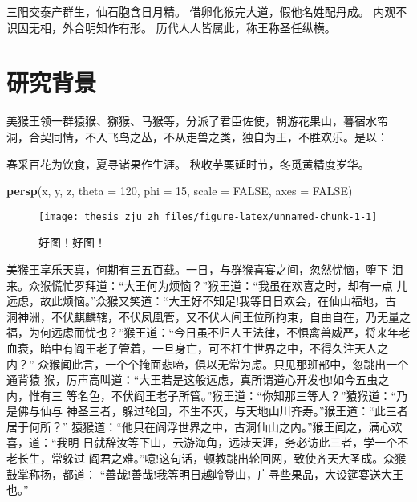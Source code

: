 \documentclass[]{style/zjuthesis}
\newenvironment{Shaded}{\begin{snugshade}}{\end{snugshade}}
\newcommand{\KeywordTok}[1]{\textcolor[rgb]{0.13,0.29,0.53}{\textbf{{#1}}}}
\newcommand{\DataTypeTok}[1]{\textcolor[rgb]{0.13,0.29,0.53}{{#1}}}
\newcommand{\DecValTok}[1]{\textcolor[rgb]{0.00,0.00,0.81}{{#1}}}
\newcommand{\OtherTok}[1]{\textcolor[rgb]{0.56,0.35,0.01}{{#1}}}
\newcommand{\NormalTok}[1]{{#1}}
\begin{document}
三阳交泰产群生，仙石胞含日月精。 借卵化猴完大道，假他名姓配丹成。
内观不识因无相，外合明知作有形。 历代人人皆属此，称王称圣任纵横。

\ZJUcontents

\ZJUmainmatter

\chapter{研究背景}

美猴王领一群猿猴、猕猴、马猴等，分派了君臣佐使，朝游花果山，暮宿水帘
洞，合契同情，不入飞鸟之丛，不从走兽之类，独自为王，不胜欢乐。是以\citep{R-base}：

春采百花为饮食，夏寻诸果作生涯。 秋收芋栗延时节，冬觅黄精度岁华。

\begin{Shaded}
\begin{Highlighting}[]
 \KeywordTok{persp}\NormalTok{(x, y, z, }\DataTypeTok{theta =} \DecValTok{120}\NormalTok{, }\DataTypeTok{phi =} \DecValTok{15}\NormalTok{, }\DataTypeTok{scale =} \OtherTok{FALSE}\NormalTok{, }
       \DataTypeTok{axes =} \OtherTok{FALSE}\NormalTok{)}
\end{Highlighting}
\end{Shaded}

\begin{figure}

{\centering \texttt{[image: thesis\_zju\_zh\_files/figure-latex/unnamed-chunk-1-1]} 

}

\caption{好图！好图！}\label{fig:unnamed-chunk-1}
\end{figure}

美猴王享乐天真，何期有三五百载。一日，与群猴喜宴之间，忽然忧恼，堕下
泪来。众猴慌忙罗拜道：``大王何为烦恼？''猴王道：``我虽在欢喜之时，却有一点
儿远虑，故此烦恼。''众猴又笑道：``大王好不知足!我等日日欢会，在仙山福地，古
洞神洲，不伏麒麟辖，不伏凤凰管，又不伏人间王位所拘束，自由自在，乃无量之
福，为何远虑而忧也？''猴王道：``今日虽不归人王法律，不惧禽兽威严，将来年老
血衰，暗中有阎王老子管着，一旦身亡，可不枉生世界之中，不得久注天人之内？''
众猴闻此言，一个个掩面悲啼，俱以无常为虑。只见那班部中，忽跳出一个通背猿
猴，厉声高叫道：``大王若是这般远虑，真所谓道心开发也!如今五虫之内，惟有三
等名色，不伏阎王老子所管。''猴王道：``你知那三等人？''猿猴道：``乃是佛与仙与
神圣三者，躲过轮回，不生不灭，与天地山川齐寿。''猴王道：``此三者居于何所？''
猿猴道：``他只在阎浮世界之中，古洞仙山之内。''猴王闻之，满心欢喜，道：``我明
日就辞汝等下山，云游海角，远涉天涯，务必访此三者，学一个不老长生，常躲过
阎君之难。''噫!这句话，顿教跳出轮回网，致使齐天大圣成。众猴鼓掌称扬，都道：
``善哉!善哉!我等明日越岭登山，广寻些果品，大设筵宴送大王也。''\citep{R-bookdown}
\end{document}
